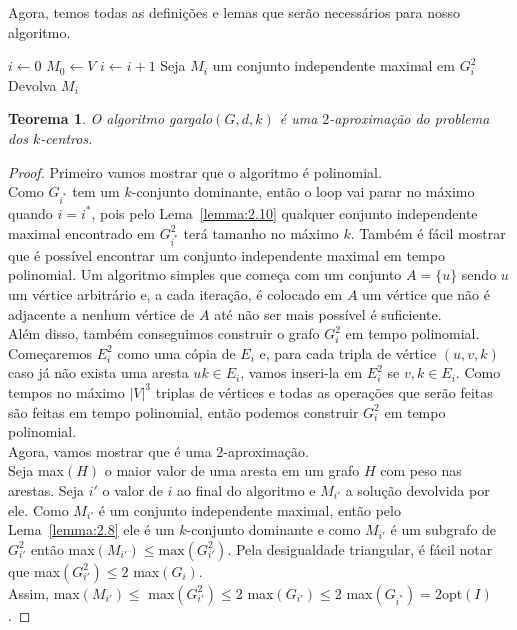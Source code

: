 \documentclass[12pt]{article}
\newcommand{\opt}{\ensuremath{\mathrm{opt}}}
\newtheorem{theorem}{Teorema}[section]
\newcommand{\red}[1]{{\color{red}{#1}}}
\begin{document}
Agora, temos todas as definições e lemas que serão necessários para nosso algoritmo.
\begin{algorithm}
    \begin{algorithmic}[1]
        \State $i \leftarrow 0$
        \State $M_0 \leftarrow V$
            \State $i\leftarrow i + 1$
            \State Seja $M_i$ um conjunto independente maximal em $G_i^2$
        \EndWhile
        \State Devolva $M_i$
        \EndFunction
    \end{algorithmic}
\end{algorithm}

\begin{theorem}
    O algoritmo {\sc gargalo}$(G,d,k)$ é uma $2$-aproximação do problema dos $k$-centros.
\end{theorem}
\begin{proof}
    Primeiro vamos mostrar que o algoritmo é polinomial. \\
    Como $G_{i^*}$ tem um $k$-conjunto dominante, então o loop vai parar no máximo quando $i=i^*$, pois pelo Lema~\ref{lemma:2.10} qualquer conjunto independente maximal encontrado em $G_{i^*}^2$ terá tamanho no máximo $k$.
    Também é fácil mostrar que é possível encontrar um conjunto independente maximal em tempo polinomial. Um algoritmo simples que começa com um conjunto $A = \{u\}$ sendo $u$ um vértice arbitrário e, a cada iteração, é colocado em $A$ um vértice que não é adjacente a nenhum vértice de $A$ até não ser mais possível é suficiente. \red{Faço um lema para explicar melhor?}\\
    Além disso, também conseguimos construir o grafo $G_i^2$ em tempo polinomial. Começaremos $E_i^2$ como uma cópia de $E_i$ e, para cada tripla de vértice $(u,v,k)$ caso já não exista uma aresta $uk \in E_i$, vamos inseri-la em $E_i^2$ se $v,k \in E_i$. Como tempos no máximo $|V|^3$ triplas de vértices e todas as operações que serão feitas são feitas em tempo polinomial, então podemos construir $G_i^2$ em tempo polinomial. \\
    Agora, vamos mostrar que é uma $2$-aproximação. \\
    Seja max$(H)$ o maior valor de uma aresta em um grafo $H$ com peso nas arestas. Seja $i'$ o valor de $i$ ao final do algoritmo e $M_{i'}$ a solução devolvida por ele. Como $M_{i'}$ é um conjunto independente maximal, então pelo Lema~\ref{lemma:2.8} ele é um $k$-conjunto dominante e como $M_{i'}$ é um subgrafo de $G_{i'}^2$ então max$(M_{i'}) \leq \text{max}(G_{i'}^2) $. Pela desigualdade triangular, é fácil notar que max$(G_{i'}^2) \leq 2$  max$(G_{i})$. \\Assim, max$(M_{i'}) \leq $ max$(G_{i'}^2) \leq 2$ max$(G_{i'}) \leq 2$ max$(G_{i^*})= 2 \opt(I)$. 
\end{proof}
\newpage
\end{document}
